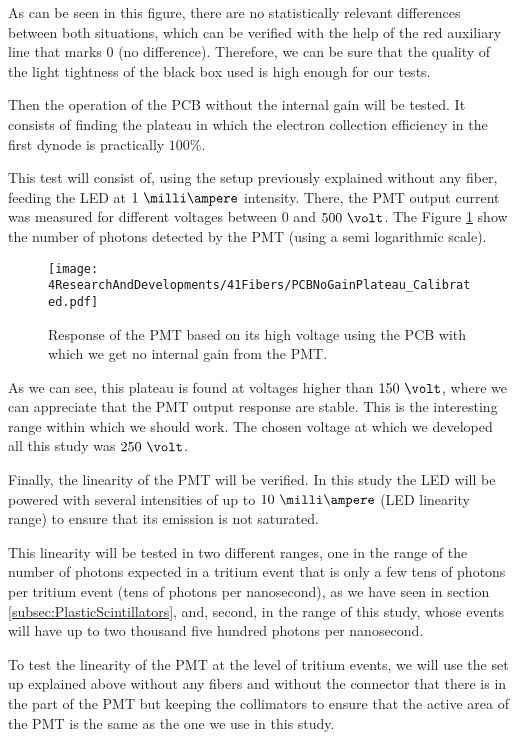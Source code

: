 As can be seen in this figure, there are no statistically relevant differences between both situations, which can be verified with the help of the red auxiliary line that marks 0 (no difference). Therefore, we can be sure that the quality of the light tightness of the black box used is high enough for our tests.

Then the operation of the PCB without the internal gain will be tested. It consists of finding the plateau in which the electron collection efficiency in the first dynode is practically $100\%$. 

This test will consist of, using the setup previously explained without any fiber, feeding the LED at $1~\milli\ampere$ intensity. There, the PMT output current was measured for different voltages between $0$ and $500~\volt$. The Figure \ref{fig:PlateauNoGainPMT} show the number of photons detected by the PMT (using a semi logarithmic scale).

\begin{figure}[h]
\centering
\texttt{[image: 4ResearchAndDevelopments/41Fibers/PCBNoGainPlateau\_Calibrated.pdf]}
\caption{Response of the PMT based on its high voltage using the PCB with which we get no internal gain from the PMT.\label{fig:PlateauNoGainPMT}}
\end{figure}

As we can see, this plateau is found at voltages higher than $150~\volt$, where we can appreciate that the PMT output response are stable. This is the interesting range within which we should work. The chosen voltage at which we developed all this study was $250~\volt$.

Finally, the linearity of the PMT will be verified. In this study the LED will be powered with several intensities of up to $10~\milli\ampere$ (LED linearity range) to ensure that its emission is not saturated.

This linearity will be tested in two different ranges, one in the range of the number of photons expected in a tritium event that is only a few tens of photons per tritium event (tens of photons per nanosecond),  as we have seen in section \ref{subsec:PlasticScintillators}, and, second, in the range of this study, whose events will have up to two thousand five hundred photons per nanosecond.

To test the linearity of the PMT at the level of tritium events, we will use the set up explained above without any fibers and without the connector that there is in the part of the PMT but keeping the collimators to ensure that the active area of the PMT is the same as the one we use in this study. 

